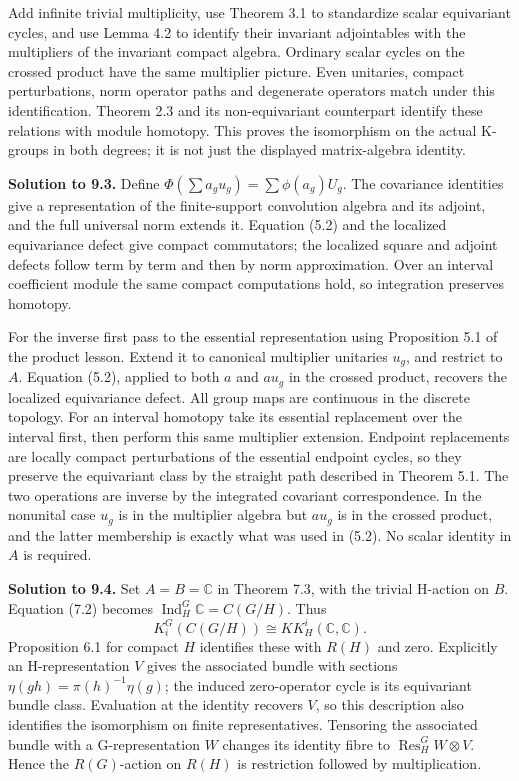 \documentclass[
  11pt,
]{article}
\begin{document}
Add infinite trivial multiplicity, use Theorem 3.1 to standardize scalar
equivariant cycles, and use Lemma 4.2 to identify their invariant
adjointables with the multipliers of the invariant compact algebra.
Ordinary scalar cycles on the crossed product have the same multiplier
picture. Even unitaries, compact perturbations, norm operator paths and
degenerate operators match under this identification. Theorem 2.3 and
its non-equivariant counterpart identify these relations with module
homotopy. This proves the isomorphism on the actual K-groups in both
degrees; it is not just the displayed matrix-algebra identity.

\textbf{Solution to 9.3.} Define \(\Phi(\sum a_gu_g)=\sum\phi(a_g)U_g\).
The covariance identities give a representation of the finite-support
convolution algebra and its adjoint, and the full universal norm extends
it. Equation (5.2) and the localized equivariance defect give compact
commutators; the localized square and adjoint defects follow term by
term and then by norm approximation. Over an interval coefficient module
the same compact computations hold, so integration preserves homotopy.

For the inverse first pass to the essential representation using
Proposition 5.1 of the product lesson. Extend it to canonical multiplier
unitaries \(u_g\), and restrict to \(A\). Equation (5.2), applied to
both \(a\) and \(au_g\) in the crossed product, recovers the localized
equivariance defect. All group maps are continuous in the discrete
topology. For an interval homotopy take its essential replacement over
the interval first, then perform this same multiplier extension.
Endpoint replacements are locally compact perturbations of the essential
endpoint cycles, so they preserve the equivariant class by the straight
path described in Theorem 5.1. The two operations are inverse by the
integrated covariant correspondence. In the nonunital case \(u_g\) is in
the multiplier algebra but \(au_g\) is in the crossed product, and the
latter membership is exactly what was used in (5.2). No scalar identity
in \(A\) is required.

\textbf{Solution to 9.4.} Set \(A=B=\mathbb C\) in Theorem 7.3, with the
trivial H-action on \(B\). Equation (7.2) becomes
\(\operatorname{Ind}_H^G\mathbb C=C(G/H)\). Thus \[
K_i^G(C(G/H))\cong KK_H^i(\mathbb C,\mathbb C).
\tag{10.3}
\] Proposition 6.1 for compact \(H\) identifies these with \(R(H)\) and
zero. Explicitly an H-representation \(V\) gives the associated bundle
with sections \(\eta(gh)=\pi(h)^{-1}\eta(g)\); the induced zero-operator
cycle is its equivariant bundle class. Evaluation at the identity
recovers \(V\), so this description also identifies the isomorphism on
finite representatives. Tensoring the associated bundle with a
G-representation \(W\) changes its identity fibre to
\(\operatorname{Res}_H^G W\otimes V\). Hence the \(R(G)\)-action on
\(R(H)\) is restriction followed by multiplication.
\end{document}
